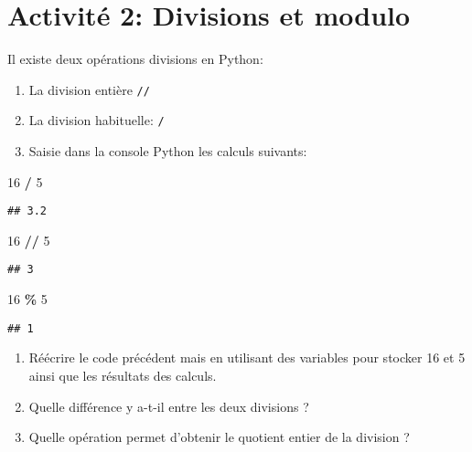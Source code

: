 \documentclass[
]{book}
\newenvironment{Shaded}{\begin{snugshade}}{\end{snugshade}}
\newcommand{\DecValTok}[1]{\textcolor[rgb]{0.00,0.00,0.81}{#1}}
\newcommand{\OperatorTok}[1]{\textcolor[rgb]{0.81,0.36,0.00}{\textbf{#1}}}
\providecommand{\tightlist}{%
  \setlength{\itemsep}{0pt}\setlength{\parskip}{0pt}}
\def\tightlist{}
\begin{document}
\newpage

\hypertarget{activituxe9-2-divisions-et-modulo}{%
\section{Activité 2: Divisions et modulo}\label{activituxe9-2-divisions-et-modulo}}

Il existe deux opérations divisions en Python:

\begin{enumerate}
\def\labelenumi{\arabic{enumi}.}
\item
  La division entière \texttt{//}
\item
  La division habituelle: \texttt{/}
\item
  Saisie dans la console Python les calculs suivants:
\end{enumerate}

\begin{Shaded}
\begin{Highlighting}[]
\DecValTok{16} \OperatorTok{/} \DecValTok{5}
\end{Highlighting}
\end{Shaded}

\begin{verbatim}
## 3.2
\end{verbatim}

\begin{Shaded}
\begin{Highlighting}[]
\DecValTok{16} \OperatorTok{//} \DecValTok{5}
\end{Highlighting}
\end{Shaded}

\begin{verbatim}
## 3
\end{verbatim}

\begin{Shaded}
\begin{Highlighting}[]
\DecValTok{16} \OperatorTok{\%} \DecValTok{5}
\end{Highlighting}
\end{Shaded}

\begin{verbatim}
## 1
\end{verbatim}

\begin{enumerate}
\def\labelenumi{\arabic{enumi}.}
\setcounter{enumi}{1}
\tightlist
\item
  Réécrire le code précédent mais en utilisant des variables pour stocker 16 et 5 ainsi que les résultats des calculs.
\item
  Quelle différence y a-t-il entre les deux divisions ?
\item
  Quelle opération permet d'obtenir le quotient entier de la division ?
\end{enumerate}
\end{document}
